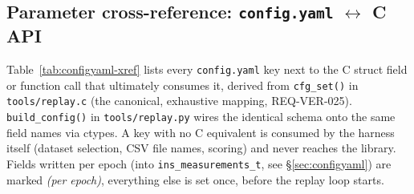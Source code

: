 \documentclass[11pt,a4paper]{article}
\newcommand{\code}[1]{\texttt{#1}}
\begin{document}
\subsection{\texorpdfstring{Parameter cross-reference: \code{config.yaml} $\leftrightarrow$ C API}{Parameter cross-reference: config.yaml vs. C API}}
\label{sec:configyaml-xref}

Table~\ref{tab:configyaml-xref} lists every \code{config.yaml} key next to the
C struct field or function call that ultimately consumes it, derived from
\code{cfg\_\allowbreak{}set()} in \code{tools/replay.c} (the canonical, exhaustive mapping,
REQ-VER-025). \code{build\_\allowbreak{}config()} in \code{tools/replay.py} wires the
identical schema onto the same field names via ctypes. A key with no C
equivalent is consumed by the harness itself (dataset selection, CSV file
names, scoring) and never reaches the library. Fields written per epoch (into
\code{ins\_\allowbreak{}measurements\_\allowbreak{}t}, see \S\ref{sec:configyaml}) are marked
\emph{(per epoch)}, everything else is set once, before the replay loop
starts.
\end{document}
